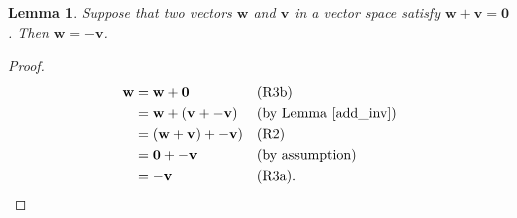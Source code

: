 \documentclass[a4paper,11pt]{book}
\newtheorem{lemma}[theorem]{Lemma}
\theoremstyle{definition}
\newcommand{\ve}[1]{\mathbf{#1}}
\begin{document}
\begin{lemma} Suppose that two vectors $\ve{w}$ and $\ve{v}$ in a vector space satisfy $\ve{w} + \ve{v} = \ve{0}$. Then $\ve{w} = -\ve{v}$.
\end{lemma}
\begin{proof}
\begin{align*}
	\ve{w} &= \ve{w} + \ve{0} && \mbox{(R3b)} \\
	&= \ve{w} + (\ve{v} + -\ve{v}) && \mbox{(by Lemma \ref{add_inv})} \\ 
	&= (\ve{w} + \ve{v}) + -\ve{v}) && \mbox{(R2)} \\ 
	&= \ve{0} + -\ve{v} && \mbox{(by assumption)} \\
	&= -\ve{v} && \mbox{(R3a)}.	
\end{align*}
\end{proof}
\end{document}
